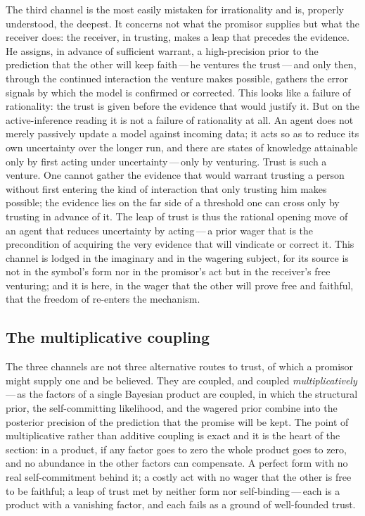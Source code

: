 The third channel is the most easily mistaken for irrationality and is, properly understood, the deepest. It concerns not what the promisor supplies but what the receiver does: the receiver, in trusting, makes a leap that precedes the evidence. He assigns, in advance of sufficient warrant, a high-precision prior to the prediction that the other will keep faith\,---\,he ventures the trust\,---\,and only then, through the continued interaction the venture makes possible, gathers the error signals by which the model is confirmed or corrected. This looks like a failure of rationality: the trust is given before the evidence that would justify it. But on the active-inference reading it is not a failure of rationality at all. An agent does not merely passively update a model against incoming data; it acts so as to reduce its own uncertainty over the longer run, and there are states of knowledge attainable only by first acting under uncertainty\,---\,only by venturing. Trust is such a venture. One cannot gather the evidence that would warrant trusting a person without first entering the kind of interaction that only trusting him makes possible; the evidence lies on the far side of a threshold one can cross only by trusting in advance of it. The leap of trust is thus the rational opening move of an agent that reduces uncertainty by acting\,---\,a prior wager that is the precondition of acquiring the very evidence that will vindicate or correct it. This channel is lodged in the imaginary and in the wagering subject, for its source is not in the symbol's form nor in the promisor's act but in the receiver's free venturing; and it is here, in the wager that the other will prove free and faithful, that the freedom of  re-enters the mechanism.

\subsection{The multiplicative coupling}
\label{p13:sub:mech-coupling}

The three channels are not three alternative routes to trust, of which a promisor might supply one and be believed. They are coupled, and coupled \emph{multiplicatively}\,---\,as the factors of a single Bayesian product are coupled, in which the structural prior, the self-committing likelihood, and the wagered prior combine into the posterior precision of the prediction that the promise will be kept. The point of multiplicative rather than additive coupling is exact and it is the heart of the section: in a product, if any factor goes to zero the whole product goes to zero, and no abundance in the other factors can compensate. A perfect form with no real self-commitment behind it; a costly act with no wager that the other is free to be faithful; a leap of trust met by neither form nor self-binding\,---\,each is a product with a vanishing factor, and each fails as a ground of well-founded trust.


